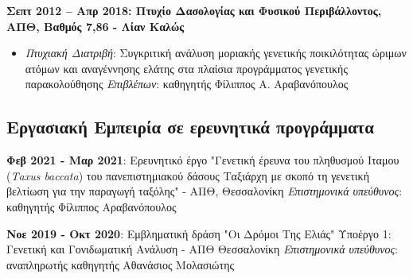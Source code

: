 \documentclass[12pt,]{scrartcl}
\begin{document}
\textbf{Σεπτ 2012 -- Απρ 2018: Πτυχίο Δασολογίας και Φυσικού Περιβάλλοντος, ΑΠΘ, Βαθμός 7,86 - Λίαν Καλώς}
\begin{itemize}
\setlength\itemsep{-0.5em}
\item \textit{Πτυχιακή Διατριβή}: Συγκριτική ανάλυση μοριακής γενετικής ποικιλότητας
ώριμων ατόμων και αναγέννησης ελάτης στα πλαίσια
προγράμματος γενετικής παρακολούθησης
\vspace{1mm}
\newline
\textit{Επιβλέπων}: καθηγητής Φίλιππος Α. Αραβανόπουλος
\end{itemize}

\vspace{-3mm}

\subsection{Εργασιακή Εμπειρία σε ερευνητικά προγράμματα}\label{Εμπειρία}
\vspace{-3mm}



\textbf{Φεβ 2021 - Μαρ 2021}: Ερευνητικό έργο "Γενετική έρευνα του πληθυσμού Ιταμου (\textit{Τaxus baccata}) του πανεπιστημιακού δάσους Ταξιάρχη με σκοπό τη γενετική
βελτίωση για την παραγωγή ταξόλης" - ΑΠΘ, Θεσσαλονίκη
\vspace{2mm}
\newline
\textit{Επιστημονικά υπεύθυνος}: καθηγητής Φίλιππος Αραβανόπουλος

\textbf{Νοε 2019 - Οκτ 2020}: Εμβληματική δράση "Οι Δρόμοι Της Ελιάς" Υποέργο 1: Γενετική και Γονιδωματική Ανάλυση - ΑΠΘ Θεσσαλονίκη
\vspace{2mm}
\newline
\textit{Επιστημονικά υπεύθυνος}: αναπληρωτής καθηγητής Αθανάσιος Μολασιώτης
\end{document}
